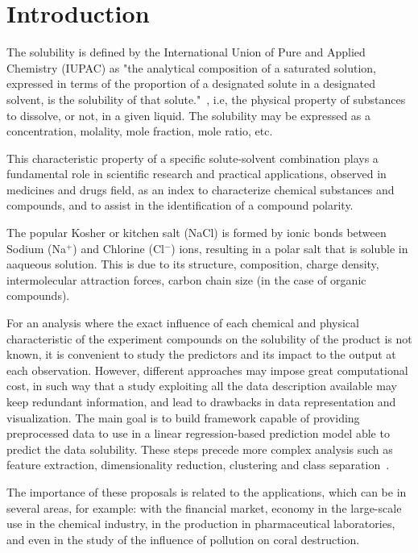 \section{Introduction}

The solubility is defined by the International Union of Pure and Applied Chemistry (IUPAC) as "the analytical composition of a saturated solution, expressed in terms of the proportion of a designated solute in a designated solvent, is the solubility of that solute."~\cite{Book1}, i.e, the physical property of substances to dissolve, or not, in a given liquid. The solubility may be expressed as a concentration, molality, mole fraction, mole ratio, etc. 

This characteristic property of a specific solute-solvent combination plays a fundamental role in scientific research and practical applications, observed in medicines and drugs field, as an index to characterize chemical substances and compounds, and to assist in the identification of a compound polarity.

The popular Kosher or kitchen salt (NaCl) is formed by ionic bonds between Sodium (Na$^+$) and Chlorine (Cl$^-$) ions, resulting in a polar salt that is soluble in aaqueous solution. This is due to its structure, composition, charge density, intermolecular attraction forces, carbon chain size (in the case of organic compounds).

For an analysis where the exact influence of each chemical and physical characteristic of the experiment compounds on the solubility of the product is not known, it is convenient to study the predictors and its impact to the output at each observation. However, different approaches may impose great computational cost, in such way that a study exploiting all the data description available may keep redundant information, and lead to drawbacks in data representation and visualization. The main goal is to build framework capable of providing preprocessed data to use in a linear regression-based prediction model able to predict the data solubility. These steps precede more complex analysis such as feature extraction, dimensionality reduction, clustering and class separation~\cite{Hastie2009, Kuhn2013, James2013}.

The importance of these proposals is related to the applications, which can be in several areas, for example: with the financial market, economy in the large-scale use in the chemical industry, in the production in pharmaceutical laboratories, and even in the study of the influence of pollution on coral destruction.

